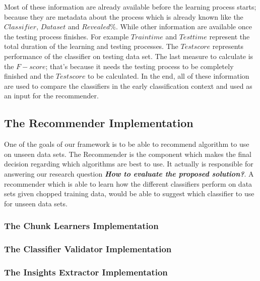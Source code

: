 Most of these information are already available before the learning process starts; because they are metadata about the process which is already known like the $Classifier$, $Data set$ and $Revealed \%$.
While other information are available once the testing process finishes. For example $Train time$ and $Test time$ represent the total duration of the learning and testing processes.
The $Test score$ represents performance of the classifier on testing data set.
The last measure to calculate is the $F-score$; that's because it needs the testing process to be completely finished and the $Test score$ to be calculated.
In the end, all of these information are used to compare the classifiers in the early classification context and used as an input for the recommender.

\subsection{The Recommender Implementation}
\label{SubsectionRecommenderImplementation}
One of the goals of our framework is to be able to recommend  algorithm to use on unseen data sets.
The Recommender is the component which makes the final decision regarding which algorithms are best to use.
It actually is responsible for answering our research question \textbf{\textit{How to evaluate the proposed solution?}}.
A recommender which is able to learn how the different classifiers perform on data sets given chopped training data,
would be able to suggest which classifier to use for unseen data sets.

\subsubsection*{The Chunk Learners Implementation}
\label{ChunkLearnersImplementation}

\subsubsection*{The Classifier Validator Implementation}
\label{ClassifierValidatorImplementation}

\subsubsection*{The Insights Extractor Implementation}
\label{InsightsExtractorImplementation}